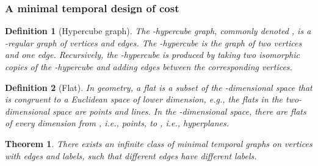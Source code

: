 \documentclass[a4paper,UKenglish]{article}
\newtheorem{theorem}{Theorem}
\newtheorem{definition}{Definition}
\begin{document}
\subsubsection{A minimal temporal design of \texorpdfstring{}{nlogn} cost}\label{sec:nlogn_minimal}

\begin{definition}[Hypercube graph]
The -hypercube graph, commonly denoted , is a -regular graph of  vertices and  edges. The -hypercube is the graph of two vertices and one edge. Recursively, the -hypercube is produced by taking two isomorphic copies of the -hypercube and adding edges between the corresponding vertices.
\end{definition}

\begin{definition}[Flat]
In geometry, a \emph{flat} is a subset of the -dimensional space that is congruent to a Euclidean space of lower dimension, e.g., the flats in the two-dimensional space are points and lines. In the -dimensional space, there are flats of every dimension from , i.e., points, to , i.e., hyperplanes.
\end{definition}
\begin{theorem}
There exists an infinite class of minimal temporal graphs on  vertices with  edges and  labels, such that different edges have different labels.
\end{theorem} 
\end{document}
